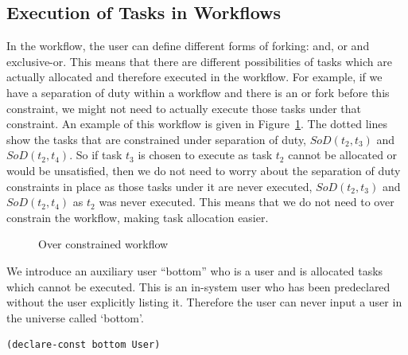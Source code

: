 \documentclass[a4paper]{report}
\begin{document}
\subsection{Execution of Tasks in Workflows}
In the workflow, the user can define different forms of forking: and, or and exclusive-or. This means that there are different possibilities of tasks which are actually allocated and therefore executed in the workflow. For example, if we have a separation of duty within a workflow and there is an or fork before this constraint, we might not need to actually execute those tasks under that constraint. An example of this workflow is given in Figure~\ref{fig:Over constrained workflow}. The dotted lines show the tasks that are constrained under separation of duty, $SoD(t_2, t_3)$ and $SoD(t_2, t_4)$. So if task $t_3$ is chosen to execute as task $t_2$ cannot be allocated or would be unsatisfied, then we do not need to worry about the separation of duty constraints in place as those tasks under it are never executed, $SoD(t_2, t_3)$ and $SoD(t_2, t_4)$ as $t_2$ was never executed. This means that we do not need to over constrain the workflow, making task allocation easier.
\begin{figure}[!htb]
\centering
{}
\caption{Over constrained workflow}
\label{fig:Over constrained workflow}
\end{figure}

We introduce an auxiliary user ``bottom'' who is a user and is allocated tasks which cannot be executed. This is an in-system user who has been predeclared without the user explicitly listing it. Therefore the user can never input a user in the universe called `bottom'.
\begin{lstlisting}[frame=single]
(declare-const bottom User)
\end{lstlisting}
\end{document}
